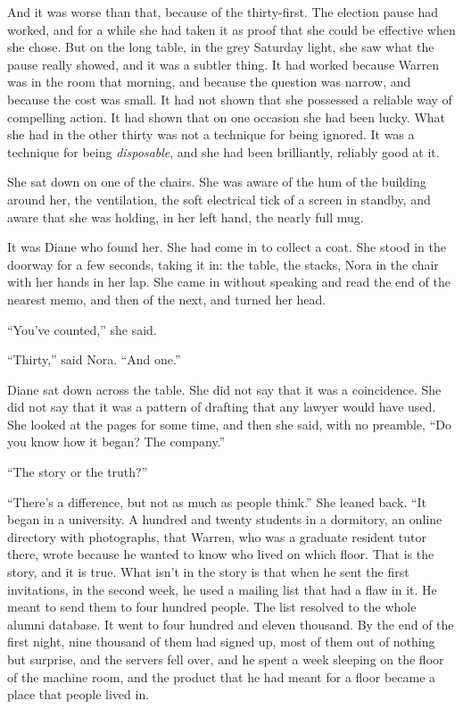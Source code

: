 And it was worse than that, because of the thirty-first. The election pause had worked, and for a while she had taken it as proof that she could be effective when she chose. But on the long table, in the grey Saturday light, she saw what the pause really showed, and it was a subtler thing. It had worked because Warren was in the room that morning, and because the question was narrow, and because the cost was small. It had not shown that she possessed a reliable way of compelling action. It had shown that on one occasion she had been lucky. What she had in the other thirty was not a technique for being ignored. It was a technique for being \emph{disposable}, and she had been brilliantly, reliably good at it.

She sat down on one of the chairs. She was aware of the hum of the building around her, the ventilation, the soft electrical tick of a screen in standby, and aware that she was holding, in her left hand, the nearly full mug.

It was Diane who found her. She had come in to collect a coat. She stood in the doorway for a few seconds, taking it in: the table, the stacks, Nora in the chair with her hands in her lap. She came in without speaking and read the end of the nearest memo, and then of the next, and turned her head.

``You've counted,'' she said.

``Thirty,'' said Nora. ``And one.''

Diane sat down across the table. She did not say that it was a coincidence. She did not say that it was a pattern of drafting that any lawyer would have used. She looked at the pages for some time, and then she said, with no preamble, ``Do you know how it began? The company.''

``The story or the truth?''

``There's a difference, but not as much as people think.'' She leaned back. ``It began in a university. A hundred and twenty students in a dormitory, an online directory with photographs, that Warren, who was a graduate resident tutor there, wrote because he wanted to know who lived on which floor. That is the story, and it is true. What isn't in the story is that when he sent the first invitations, in the second week, he used a mailing list that had a flaw in it. He meant to send them to four hundred people. The list resolved to the whole alumni database. It went to four hundred and eleven thousand. By the end of the first night, nine thousand of them had signed up, most of them out of nothing but surprise, and the servers fell over, and he spent a week sleeping on the floor of the machine room, and the product that he had meant for a floor became a place that people lived in.

